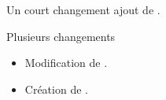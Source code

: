 \begin{doctopic}{Un court changement}
    ajout de .
\end{doctopic}

\begin{doctopic}[ml]{Plusieurs changements}
    \begin{itemize}
        \item Modification de .
        \item Création de .
    \end{itemize}
\end{doctopic}
